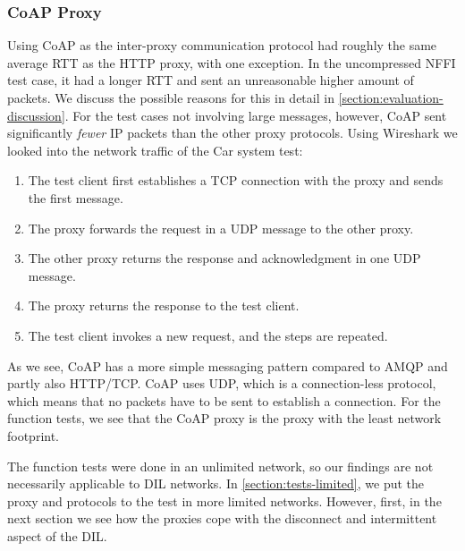 \subsubsection{CoAP Proxy}

Using CoAP as the inter-proxy communication protocol had roughly the same
average RTT as the HTTP proxy, with one exception. In the uncompressed NFFI test
case, it had a longer RTT and sent an unreasonable higher amount of packets. We
discuss the possible reasons for this in detail in
\cref{section:evaluation-discussion}. For the test cases not involving large
messages, however, CoAP sent significantly \textit{fewer} IP packets than the
other proxy protocols. Using Wireshark we looked into the network traffic of the
Car system test:

\begin{enumerate}

    \item The test client first establishes a TCP connection with the proxy and sends
    the first message.

    \item The proxy forwards the request in a UDP message to the other proxy.

    \item The other proxy returns the response and acknowledgment in one UDP
    message.

    \item The proxy returns the response to the test client.

    \item The test client invokes a new request, and the steps are repeated.


\end{enumerate}

As we see, CoAP has a more simple messaging pattern compared to AMQP and partly
also HTTP/TCP. CoAP uses UDP, which is a connection-less protocol, which means
that no packets have to be sent to establish a connection. For the
function tests, we see that the CoAP proxy is the proxy with the least network
footprint.

The function tests were done in an unlimited network, so our findings are not
necessarily applicable to DIL networks. In \cref{section:tests-limited}, we put
the proxy and protocols to the test in more limited networks. However, first, in
the next section we see how the proxies cope with the disconnect and
intermittent aspect of the DIL.


